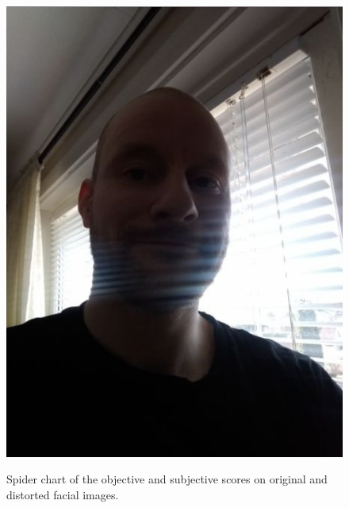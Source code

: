 \begin{figure}[H]
        {\includegraphics[scale = 0.09]{figures/0329telegram_compression.png}\hspace{0.7cm}}
    \caption{Spider chart of the objective and subjective scores on original and distorted facial images.}
    \label{fig:SpiderDist1}
\end{figure}

\newpage

